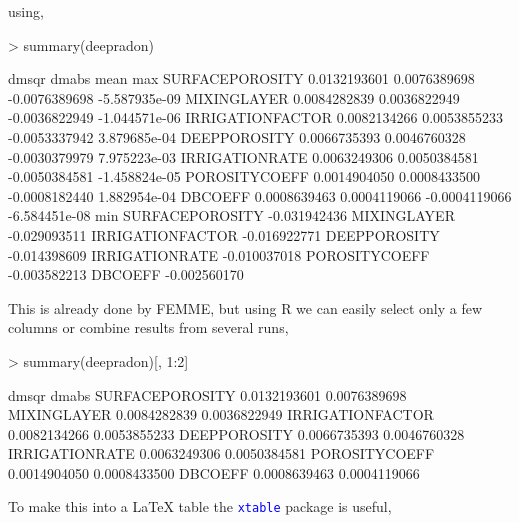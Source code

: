 \documentclass{scrartcl}
\newcommand{\Rcode}[1]{\texttt{\textcolor{blue}{#1}}}
\newcommand{\R}{\textsf{R}}
\begin{document}
using,
\begin{Schunk}
\begin{Sinput}
> summary(deepradon)
\end{Sinput}
\begin{Soutput}
                        dmsqr        dmabs          mean           max
SURFACEPOROSITY  0.0132193601 0.0076389698 -0.0076389698 -5.587935e-09
MIXINGLAYER      0.0084282839 0.0036822949 -0.0036822949 -1.044571e-06
IRRIGATIONFACTOR 0.0082134266 0.0053855233 -0.0053337942  3.879685e-04
DEEPPOROSITY     0.0066735393 0.0046760328 -0.0030379979  7.975223e-03
IRRIGATIONRATE   0.0063249306 0.0050384581 -0.0050384581 -1.458824e-05
POROSITYCOEFF    0.0014904050 0.0008433500 -0.0008182440  1.882954e-04
DBCOEFF          0.0008639463 0.0004119066 -0.0004119066 -6.584451e-08
                          min
SURFACEPOROSITY  -0.031942436
MIXINGLAYER      -0.029093511
IRRIGATIONFACTOR -0.016922771
DEEPPOROSITY     -0.014398609
IRRIGATIONRATE   -0.010037018
POROSITYCOEFF    -0.003582213
DBCOEFF          -0.002560170
\end{Soutput}
\end{Schunk}
This is already done by FEMME, but using \R{} we can easily select
only a few columns or combine results from several runs,

\begin{Schunk}
\begin{Sinput}
> summary(deepradon)[, 1:2]
\end{Sinput}
\begin{Soutput}
                        dmsqr        dmabs
SURFACEPOROSITY  0.0132193601 0.0076389698
MIXINGLAYER      0.0084282839 0.0036822949
IRRIGATIONFACTOR 0.0082134266 0.0053855233
DEEPPOROSITY     0.0066735393 0.0046760328
IRRIGATIONRATE   0.0063249306 0.0050384581
POROSITYCOEFF    0.0014904050 0.0008433500
DBCOEFF          0.0008639463 0.0004119066
\end{Soutput}
\end{Schunk}
To make this into a \LaTeX{} table the \Rcode{xtable} package is useful,
\end{document}
